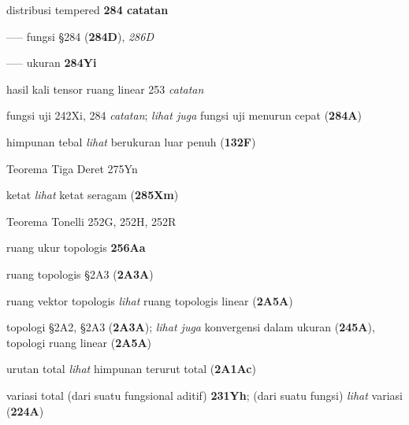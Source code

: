 distribusi tempered {\bf 284 catatan}


----- fungsi \S284 ({\bf 284D}), {\it 286D}


----- ukuran {\bf 284Yi}


hasil kali tensor ruang linear 253 {\it catatan}




fungsi uji 242Xi, 284 {\it catatan\/};
  {\it lihat juga} fungsi uji menurun cepat ({\bf 284A})




himpunan tebal {\it lihat} berukuran luar penuh ({\bf 132F})




Teorema Tiga Deret 275Yn






{ketat {\it lihat} ketat seragam ({\bf 285Xm})}

























Teorema Tonelli 252G, 252H, 252R




ruang ukur topologis {\bf 256Aa}





ruang topologis \S2A3 ({\bf 2A3A})


ruang vektor topologis {\it lihat} ruang topologis linear
({\bf 2A5A})


topologi \S2A2, \S2A3 ({\bf 2A3A}); 
  {\it lihat juga} konvergensi dalam ukuran ({\bf 245A}),
topologi ruang linear ({\bf 2A5A})





urutan total
  {\it lihat} himpunan terurut total ({\bf 2A1Ac})


variasi total (dari suatu fungsional aditif) {\bf 231Yh};
(dari suatu fungsi) {\it lihat} variasi ({\bf 224A})







